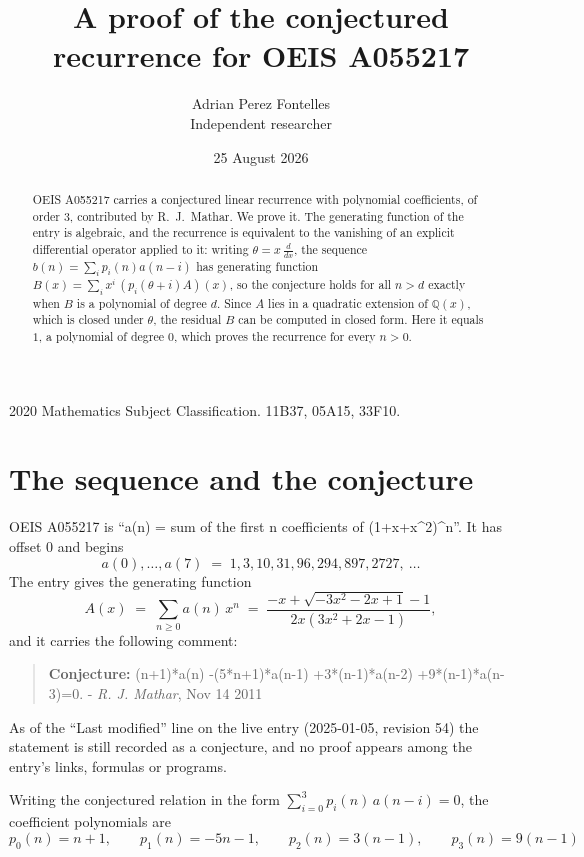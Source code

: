 \documentclass[11pt,a4paper]{article}
\title{A proof of the conjectured recurrence for OEIS A055217}
\author{Adrian Perez Fontelles\\ \small Independent researcher}
\date{25 August 2026}
\theoremstyle{plain}
\theoremstyle{definition}
\begin{document}
\maketitle

\begin{abstract}
OEIS A055217 carries a conjectured linear recurrence with polynomial coefficients, of
order 3, contributed by R.~J.~Mathar. We prove it. The generating function of the
entry is algebraic, and the recurrence is equivalent to the vanishing of an explicit
differential operator applied to it: writing $\theta=x\,\frac{d}{dx}$, the sequence
$b(n)=\sum_{i}p_{i}(n)a(n-i)$ has generating function
$B(x)=\sum_{i}x^{i}\,(p_{i}(\theta+i)A)(x)$, so the conjecture holds for all $n>d$ exactly
when $B$ is a polynomial of degree $d$. Since $A$ lies in a quadratic extension of
$\mathbb{Q}(x)$, which is closed under $\theta$, the residual $B$ can be computed in
closed form. Here it equals $1$, a polynomial of degree $0$, which proves
the recurrence for every $n>0$.
\end{abstract}

\noindent\small 2020 Mathematics Subject Classification. 11B37, 05A15, 33F10.\normalsize

\section{The sequence and the conjecture}

OEIS A055217 is ``a(n) = sum of the first n coefficients of (1+x+x\^{}2)\^{}n''. It has offset $0$ and begins
\[
a(0),\dots,a(7)\;=\;1, 3, 10, 31, 96, 294, 897, 2727,\ \dots
\]
The entry gives the generating function
\begin{equation}\label{eq:gf}
A(x)\;=\;\sum_{n\ge 0} a(n)\,x^{n}\;=\;\frac{- x + \sqrt{- 3 x^{2} - 2 x + 1} - 1}{2 x \left(3 x^{2} + 2 x - 1\right)} ,
\end{equation}
and it carries the following comment:
\begin{quote}\small
\textbf{Conjecture:} (n+1)*a(n) -(5*n+1)*a(n-1) +3*(n-1)*a(n-2) +9*(n-1)*a(n-3)=0. - \emph{R. J. Mathar}, Nov 14 2011
\end{quote}
As of the ``Last modified'' line on the live entry (2025-01-05, revision 54) the
statement is still recorded as a conjecture, and no proof appears among the entry's links,
formulas or programs.

Writing the conjectured relation in the form $\sum_{i=0}^{3}p_{i}(n)\,a(n-i)=0$,
the coefficient polynomials are
\[
p_{0}(n)=n + 1,\qquad p_{1}(n)=- 5 n - 1,\qquad p_{2}(n)=3 \left(n - 1\right),\qquad p_{3}(n)=9 \left(n - 1\right)
\]
\end{document}
